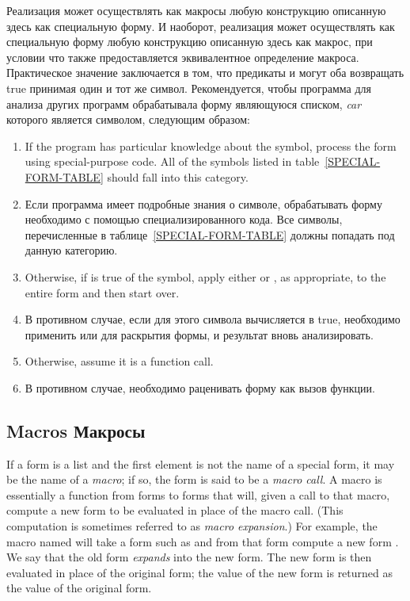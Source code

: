 Реализация может осуществлять как макросы любую конструкцию описанную здесь как
специальную форму. И наоборот, реализация может осуществлять как специальную
форму любую конструкцию описанную здесь как макрос, при условии что также
предоставляется эквивалентное определение макроса.
Практическое значение заключается в том, что предикаты  и
 могут оба возвращать true принимая один и тот же символ.
Рекомендуется, чтобы программа для анализа других программ обрабатывала форму
являющуюся списком, \textit{car} которого является символом, следующим образом:

\begin{enumerate}
\item
If the program has particular knowledge about the symbol,
process the form using special-purpose code.
All of the symbols listed in table~\ref{SPECIAL-FORM-TABLE}
should fall into this category. 

\item
Если программа имеет подробные знания о символе, обрабатывать форму необходимо с
помощью специализированного кода. Все символы, перечисленные в
таблице~\ref{SPECIAL-FORM-TABLE} должны попадать под данную категорию.

\item
Otherwise, if  is true of the symbol, apply either
 or , as appropriate,
to the entire form and then start over.

\item
В противном случае, если для этого символа  вычисляется в
true, необходимо применить  или  для раскрытия
формы, и результат вновь анализировать.

\item
Otherwise, assume it is a function call.

\item
В противном случае, необходимо раценивать форму как вызов функции.
\end{enumerate}

\subsection{Macros Макросы}

If a form is a list and the first element is not the name of a special
form, it may be the name of a \textit{macro}; if so, the form is said
to be a \textit{macro call}.  A macro is essentially a function from
forms to forms that will, given a call to that macro, compute
a new form to be evaluated in place of the macro call.
(This computation is sometimes referred to as \textit{macro expansion}.)
For example, the macro named  will take a form such as
 and from that form compute a new form
.  We say that the old
form \textit{expands} into the new form.  The new form is then evaluated in
place of the original form; the value of the new form is returned as the
value of the original form.

